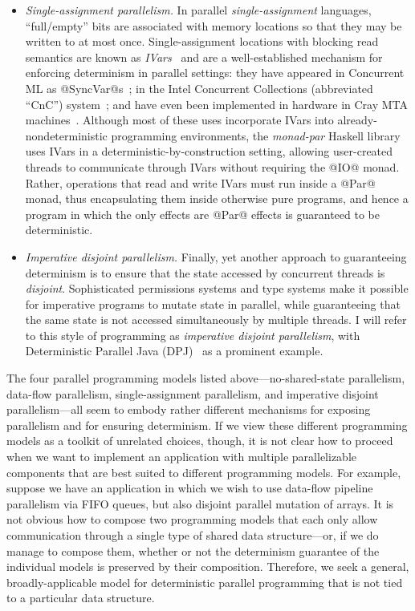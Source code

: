 \begin{itemize}
\item \emph{Single-assignment parallelism.}  In parallel
  \emph{single-assignment} languages, ``full/empty'' bits are
  associated with memory locations so that they may be written to at
  most once. Single-assignment locations with blocking read semantics
  are known as \emph{IVars}~\cite{IStructures} and are a
  well-established mechanism for enforcing determinism in parallel
  settings: they have appeared in Concurrent ML as
  @SyncVar@s~\cite{reppy-cml-book}; in the Intel Concurrent
  Collections (abbreviated ``CnC'') system~\cite{CnC}; and have even
  been implemented in hardware in Cray MTA machines~\cite{cray-mta}.
  Although most of these uses incorporate IVars into
  already-nondeterministic programming environments, the
  \emph{monad-par} Haskell library~\cite{monad-par} uses IVars in a
  deterministic-by-construction setting, allowing user-created threads
  to communicate through IVars without requiring the @IO@ monad.
  Rather, operations that read and write IVars must run inside a @Par@
  monad, thus encapsulating them inside otherwise pure programs, and
  hence a program in which the only effects are @Par@ effects is
  guaranteed to be deterministic.

\item \emph{Imperative disjoint parallelism.}  Finally, yet another
  approach to guaranteeing determinism is to ensure that the state
  accessed by concurrent threads is \emph{disjoint}.  Sophisticated
  permissions systems and type systems make it possible for imperative
  programs to mutate state in parallel, while guaranteeing that the
  same state is not accessed simultaneously by multiple threads.  I
  will refer to this style of programming as \emph{imperative disjoint
    parallelism}, with Deterministic Parallel Java
  (DPJ)~\cite{dpj-oopsla, dpj-hotpar09} as a prominent example.
\end{itemize}
The four parallel programming models listed above---no-shared-state
parallelism, data-flow parallelism, single-assignment parallelism, and
imperative disjoint parallelism---all seem to embody rather different
mechanisms for exposing parallelism and for ensuring determinism.  If
we view these different programming models as a toolkit of unrelated
choices, though, it is not clear how to proceed when we want to
implement an application with multiple parallelizable components that
are best suited to different programming models.  For example, suppose
we have an application in which we wish to use data-flow pipeline
parallelism via FIFO queues, but also disjoint parallel mutation of
arrays.  It is not obvious how to compose two programming models that
each only allow communication through a single type of shared data
structure---or, if we do manage to compose them, whether or not the
determinism guarantee of the individual models is preserved by their
composition.  Therefore, we seek a general, broadly-applicable model
for deterministic parallel programming that is not tied to a
particular data structure.

